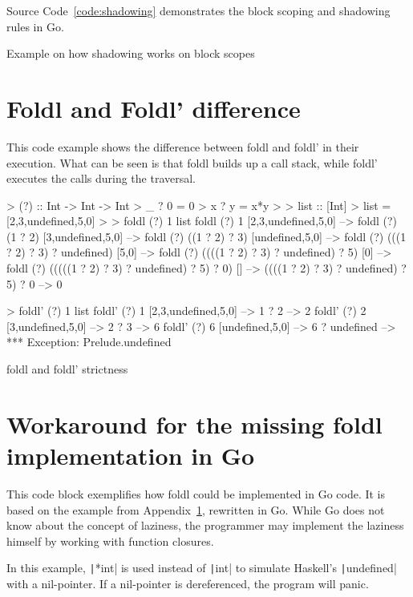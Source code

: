 Source Code~\ref{code:shadowing} demonstrates the block scoping and shadowing rules
in Go.

\begin{code}
	\caption{Example on how shadowing works on block scopes}\label{code:shadowing}
\end{code}

\section{Foldl and Foldl' difference}\label{appendix:foldl-strictness}

This code example shows the difference between foldl and foldl' in their
execution. What can be seen is that foldl builds up a call stack, while
foldl' executes the calls during the traversal.

\begin{code}
    \begin{haskellcode}
> (?) :: Int -> Int -> Int
> _ ? 0 = 0
> x ? y = x*y
>
> list :: [Int]
> list = [2,3,undefined,5,0]
>
> foldl (?) 1 list
foldl (?) 1 [2,3,undefined,5,0] -->
foldl (?) (1 ? 2) [3,undefined,5,0] -->
foldl (?) ((1 ? 2) ? 3) [undefined,5,0] -->
foldl (?) (((1 ? 2) ? 3) ? undefined) [5,0] -->
foldl (?) ((((1 ? 2) ? 3) ? undefined) ? 5) [0] -->
foldl (?) (((((1 ? 2) ? 3) ? undefined) ? 5) ? 0) [] -->
((((1 ? 2) ? 3) ? undefined) ? 5) ? 0 -->
0

> foldl' (?) 1 list
foldl' (?) 1 [2,3,undefined,5,0] -->
    1 ? 2 --> 2
foldl' (?) 2 [3,undefined,5,0] -->
    2 ? 3 --> 6
foldl' (?) 6 [undefined,5,0] -->
    6 ? undefined -->
*** Exception: Prelude.undefined
    \end{haskellcode}
    \caption{foldl and foldl' strictness\autocite{fold-types}}
\end{code}

\section{Workaround for the missing foldl implementation in Go}\label{appendix:foldl-go}

This code block exemplifies how foldl could be implemented in Go code. It is based on the example
from Appendix~\ref{appendix:foldl-strictness}, rewritten in Go. While Go does not know about
the concept of laziness, the programmer may implement the laziness himself by working with function
closures.

In this example, \texttt|*int| is used instead of \texttt|int| to simulate Haskell's
\texttt|undefined| with a nil-pointer.
If a nil-pointer is dereferenced, the program will panic.

